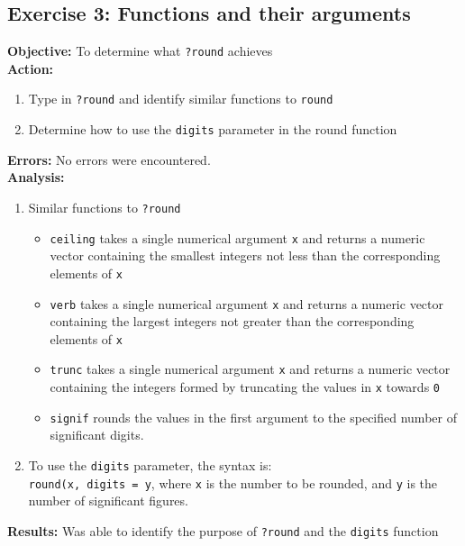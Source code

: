\documentclass{article}
\begin{document}
\subsection{Exercise 3: Functions and their arguments}
\textbf{Objective:} To determine what \verb|?round| achieves\\
\textbf{Action:}
\begin{enumerate}
    \item Type in \verb|?round| and identify similar functions to \verb|round|
    \item Determine how to use the \verb|digits| parameter in the round function
\end{enumerate}
\textbf{Errors:} No errors were encountered.\\
\textbf{Analysis:} 
\begin{enumerate}
    \item Similar functions to \verb|?round|
    \begin{itemize}
        \item \verb|ceiling| takes a single numerical argument \texttt{x} and returns a numeric vector containing the smallest integers not less than the corresponding elements of \texttt{x}
        \item \verb|verb| takes a single numerical argument \texttt{x} and returns a numeric vector containing the largest integers not greater than the corresponding elements of \texttt{x}
        \item \verb|trunc| takes a single numerical argument \texttt{x} and returns a numeric vector containing the integers formed by truncating the values in \texttt{x} towards \texttt{0}
        \item \verb|signif| rounds the values in the first argument to the specified number of significant digits.
    \end{itemize}
    \item To use the \verb|digits| parameter, the syntax is:\\
    \verb|round(x, digits = y|, where \texttt{x} is the number to be rounded, and \texttt{y} is the number of significant figures.
\end{enumerate}
\textbf{Results:} Was able to identify the purpose of \verb|?round| and the \verb|digits| function

\end{document}
